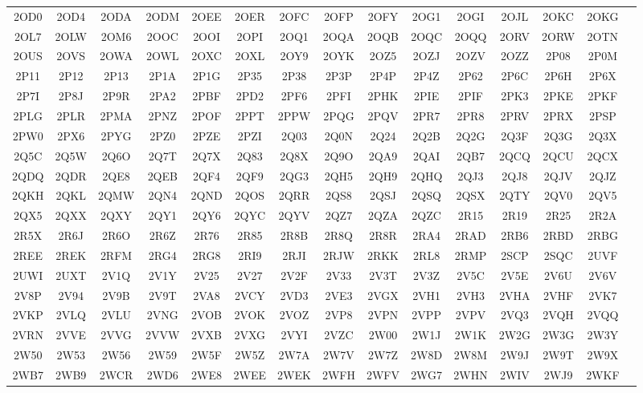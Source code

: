 \begin{longtable}{ c c c c c c c c c c c c c c c }
	2OD0 & 2OD4 & 2ODA & 2ODM & 2OEE & 2OER & 2OFC & 2OFP & 2OFY & 2OG1 & 2OGI & 2OJL & 2OKC & 2OKG  \\
	2OL7 & 2OLW & 2OM6 & 2OOC & 2OOI & 2OPI & 2OQ1 & 2OQA & 2OQB & 2OQC & 2OQQ & 2ORV & 2ORW & 2OTN  \\
	2OUS & 2OVS & 2OWA & 2OWL & 2OXC & 2OXL & 2OY9 & 2OYK & 2OZ5 & 2OZJ & 2OZV & 2OZZ & 2P08 & 2P0M  \\
	2P11 & 2P12 & 2P13 & 2P1A & 2P1G & 2P35 & 2P38 & 2P3P & 2P4P & 2P4Z & 2P62 & 2P6C & 2P6H & 2P6X  \\
	2P7I & 2P8J & 2P9R & 2PA2 & 2PBF & 2PD2 & 2PF6 & 2PFI & 2PHK & 2PIE & 2PIF & 2PK3 & 2PKE & 2PKF  \\
	2PLG & 2PLR & 2PMA & 2PNZ & 2POF & 2PPT & 2PPW & 2PQG & 2PQV & 2PR7 & 2PR8 & 2PRV & 2PRX & 2PSP  \\
	2PW0 & 2PX6 & 2PYG & 2PZ0 & 2PZE & 2PZI & 2Q03 & 2Q0N & 2Q24 & 2Q2B & 2Q2G & 2Q3F & 2Q3G & 2Q3X  \\
	2Q5C & 2Q5W & 2Q6O & 2Q7T & 2Q7X & 2Q83 & 2Q8X & 2Q9O & 2QA9 & 2QAI & 2QB7 & 2QCQ & 2QCU & 2QCX  \\
	2QDQ & 2QDR & 2QE8 & 2QEB & 2QF4 & 2QF9 & 2QG3 & 2QH5 & 2QH9 & 2QHQ & 2QJ3 & 2QJ8 & 2QJV & 2QJZ  \\
	2QKH & 2QKL & 2QMW & 2QN4 & 2QND & 2QOS & 2QRR & 2QS8 & 2QSJ & 2QSQ & 2QSX & 2QTY & 2QV0 & 2QV5  \\
	2QX5 & 2QXX & 2QXY & 2QY1 & 2QY6 & 2QYC & 2QYV & 2QZ7 & 2QZA & 2QZC & 2R15 & 2R19 & 2R25 & 2R2A  \\
	2R5X & 2R6J & 2R6O & 2R6Z & 2R76 & 2R85 & 2R8B & 2R8Q & 2R8R & 2RA4 & 2RAD & 2RB6 & 2RBD & 2RBG  \\
	2REE & 2REK & 2RFM & 2RG4 & 2RG8 & 2RI9 & 2RJI & 2RJW & 2RKK & 2RL8 & 2RMP & 2SCP & 2SQC & 2UVF  \\
	2UWI & 2UXT & 2V1Q & 2V1Y & 2V25 & 2V27 & 2V2F & 2V33 & 2V3T & 2V3Z & 2V5C & 2V5E & 2V6U & 2V6V  \\
	2V8P & 2V94 & 2V9B & 2V9T & 2VA8 & 2VCY & 2VD3 & 2VE3 & 2VGX & 2VH1 & 2VH3 & 2VHA & 2VHF & 2VK7  \\
	2VKP & 2VLQ & 2VLU & 2VNG & 2VOB & 2VOK & 2VOZ & 2VP8 & 2VPN & 2VPP & 2VPV & 2VQ3 & 2VQH & 2VQQ  \\
	2VRN & 2VVE & 2VVG & 2VVW & 2VXB & 2VXG & 2VYI & 2VZC & 2W00 & 2W1J & 2W1K & 2W2G & 2W3G & 2W3Y  \\
	2W50 & 2W53 & 2W56 & 2W59 & 2W5F & 2W5Z & 2W7A & 2W7V & 2W7Z & 2W8D & 2W8M & 2W9J & 2W9T & 2W9X  \\
	2WB7 & 2WB9 & 2WCR & 2WD6 & 2WE8 & 2WEE & 2WEK & 2WFH & 2WFV & 2WG7 & 2WHN & 2WIV & 2WJ9 & 2WKF  \\

\end{longtable}
